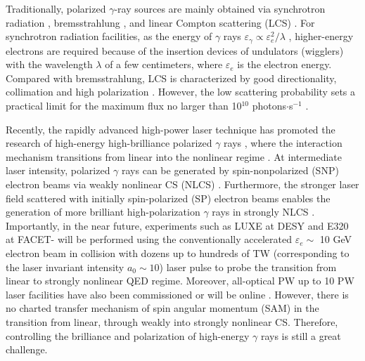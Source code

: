 \documentclass[10pt,twocolumn,showpacs,amsmath,amssymb,floatfix,superscriptaddress]{revtex4-2}
\begin{document}
Traditionally, polarized $\gamma$-ray sources are mainly obtained via synchrotron radiation \cite{Rousse2001,Bilderback2005}, bremsstrahlung \cite{Schwengner2005, Sonnabend2011}, and linear Compton scattering (LCS) \cite{Kawase2008,Amano2009,Ur2015}. For synchrotron radiation facilities, as the energy of $\gamma$ rays $\varepsilon_\gamma \propto \varepsilon_e^2/\lambda$ \cite{Bech2009,Als2011}, higher-energy electrons are required because of the insertion devices of undulators (wigglers) with the wavelength $\lambda$ of a few centimeters, where $\varepsilon_e$ is the electron energy. Compared with bremsstrahlung, LCS is characterized by good directionality, collimation and high polarization \cite{Albert2010,Sarri2014}. However, the low scattering probability sets a practical limit for the maximum flux no larger than 10$^{10}$ photons$\cdot$s$^{-1}$ \cite{Budker2022}.

Recently, the rapidly advanced high-power laser technique \cite{Gales2018,Danson2019,Yoon2019,Yoon2021} has promoted the research of high-energy high-brilliance polarized $\gamma$ rays \cite{Sarri2014,Khrennikov2015,Yan2017}, where the interaction mechanism transitions from linear into the nonlinear regime \cite{Bula1996,Ivanov2004,Yousef2006,Xiao2023}. At intermediate laser intensity, polarized $\gamma$ rays can be generated by spin-nonpolarized (SNP) electron beams via weakly nonlinear CS (NLCS) \cite{Wistisen2019,King2020,Tang2020,Wang2022}. Furthermore, the stronger laser field scattered with initially spin-polarized (SP) electron beams enables the generation of more brilliant high-polarization $\gamma$ rays in strongly NLCS \cite{Li2020}. Importantly, in the near future, experiments such as LUXE at DESY \cite{Abramowicz2021} and E320 at FACET-\uppercase\expandafter{} \cite{Meuren2019} will be performed using the conventionally accelerated $\varepsilon_{e} \sim$ 10 GeV electron beam in collision with dozens up to hundreds of TW (corresponding to the laser invariant intensity $a_0 \sim 10$) laser pulse to probe the transition from linear to strongly nonlinear QED regime. Moreover, all-optical PW up to 10 PW laser facilities have also been commissioned or will be online \cite{Bruno2014,Zou2014,Gan2021,Gonoskov2022,Fedotov2023}. However, there is no charted transfer mechanism of spin angular momentum (SAM) in the transition from linear, through weakly into strongly nonlinear CS. Therefore, controlling the brilliance and polarization of high-energy $\gamma$ rays is still a great challenge. 
\end{document}
